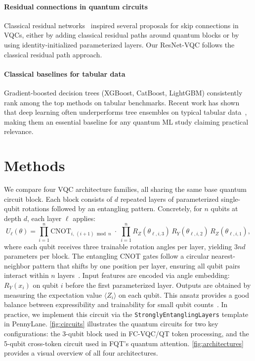 \documentclass[10pt,conference]{IEEEtran}
\begin{document}
\paragraph{Residual connections in quantum circuits}
Classical residual networks~\cite{he2016deep} inspired several proposals for skip connections in VQCs, either by adding classical residual paths around quantum blocks or by using identity-initialized parameterized layers.
Our ResNet-VQC follows the classical residual path approach.

\paragraph{Classical baselines for tabular data}
Gradient-boosted decision trees (XGBoost, CatBoost, LightGBM) consistently rank among the top methods on tabular benchmarks.
Recent work has shown that deep learning often underperforms tree ensembles on typical tabular data~\cite{grinsztajn2022tree}, making them an essential baseline for any quantum ML study claiming practical relevance.

\section{Methods}
\label{sec:methods}

We compare four VQC architecture families, all sharing the same base quantum circuit block.
Each block consists of $d$ repeated layers of parameterized single-qubit rotations followed by an entangling pattern.
Concretely, for $n$ qubits at depth $d$, each layer $\ell$ applies:
\begin{equation}
    U_\ell(\theta) = \prod_{i=1}^{n} \mathrm{CNOT}_{i,\,(i+1)\bmod n}
    \;\cdot\; \prod_{i=1}^{n} R_Z(\theta_{\ell,i,3})\, R_Y(\theta_{\ell,i,2})\, R_Z(\theta_{\ell,i,1}),
\end{equation}
where each qubit receives three trainable rotation angles per layer, yielding $3nd$ parameters per block.
The entangling CNOT gates follow a circular nearest-neighbor pattern that shifts by one position per layer, ensuring all qubit pairs interact within $n$ layers~\cite{schuld2021effect}.
Input features are encoded via angle embedding: $R_Y(x_i)$ on qubit $i$ before the first parameterized layer.
Outputs are obtained by measuring the expectation value $\langle Z_i \rangle$ on each qubit.
This ansatz provides a good balance between expressibility and trainability for small qubit counts~\cite{sim2019expressibility}.
In practice, we implement this circuit via the \texttt{StronglyEntanglingLayers} template in PennyLane.
\cref{fig:circuits} illustrates the quantum circuits for two key configurations: the 3-qubit block used in FC-VQC/QT token processing, and the 5-qubit cross-token circuit used in FQT's quantum attention.
\cref{fig:architectures} provides a visual overview of all four architectures.
\end{document}
